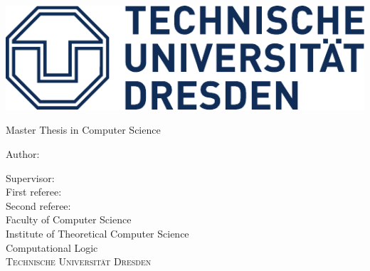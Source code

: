 \begingroup%
\noindent\centering%
\makeatletter%
\includegraphics{res/TUD-blue.pdf}

\vspace{5ex}%
\noindent%
\LARGE%
\textsf{Master Thesis in Computer Science}

\vspace{10ex}%
\noindent%
\begin{OnehalfSpace}%
  {\textsf{\Huge\@title}}
\end{OnehalfSpace}

\vspace{5ex}
\noindent
Author: \@author\\

\vfill
\noindent
\raggedright
Supervisor: \supervisor\\
First referee: \\
Second referee: \\

\Large
\vspace{5ex}
\noindent
Faculty of Computer Science\\
Institute of Theoretical Computer Science\\
Computational Logic\\
\textsc{Technische Universität Dresden}\\[4ex]
\@date
\normalsize
\makeatother
\endgroup
